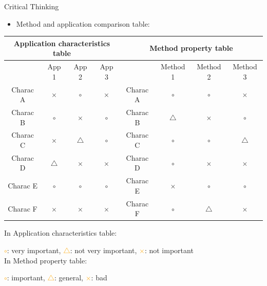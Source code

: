 \documentclass[
 size=14pt,
 paper=smartboard,  %
 mode=present, 		%
 display=slides, 	%
 style=tuliplab,  	%
 pauseslide,
 fleqn,leqno]{powerdot}{}
\begin{document}
\begin{slide}[toc=,bm=]{Critical Thinking}

\begin{itemize}
  \item Method and application comparison table:
\end{itemize}


\begin{tabular}{|c|c|c|c|c|c|c|c|}
\hline
\multicolumn{4}{|c|}{Application characteristics table} & \multicolumn{4}{|c|}{Method property table} \\
\hline
        & App 1   & App 2   & App 3 &             & Method 1  & Method 2  & Method 3\\
\hline
Charac A& $\times$  &  $\circ$  &  $\times$ & Charac A  &   $\circ$ & $\circ$   & $\times$  \\
\hline
Charac B&  $\circ$  &  $\times$ & $\circ$   & Charac B  &   $\bigtriangleup$ & $\times$  & $\circ$  \\
\hline
Charac C&  $\times$ & $\bigtriangleup$  & $\circ$   & Charac C  &   $\circ$ & $\circ$    & $\bigtriangleup$  \\
\hline
Charac D& $\bigtriangleup$ & $\times$  & $\times$   & Charac D  &  $\circ$  & $\times$   & $\times$  \\
\hline
Charac E& $\circ$  &  $\circ$  & $\circ$    & Charac E  &  $\times$ &  $\circ$   &  $\circ$   \\
\hline
Charac F&  $\times$ & $\times$ & $\times$    & Charac F  &    $\circ$  & $\bigtriangleup$  &  $\times$  \\
\hline
\hline
\end{tabular}

\vspace{0.5cm}
In Application characteristics table:

\textcolor{orange}{$\circ$}: very important,
\textcolor{orange}{$\bigtriangleup$}: not very important,
\textcolor{orange}{$\times$}: not important \\

\vspace{0.5cm}
In Method property table:

\textcolor{orange}{$\circ$}: important,
\textcolor{orange}{$\bigtriangleup$}: general,
\textcolor{orange}{$\times$}: bad

\end{slide}
\end{document}
